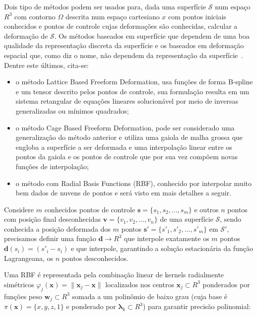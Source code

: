 Dois tipo de métodos podem ser usados para, dada uma superfície $\mathcal{S}$ num espaço $R^3$ com contorno $\Omega$ descrita num espaço cartesiano $x$ com pontos iniciais conhecidos e pontos de controle cujas deformações são conhecidas, calcular a deformação de $\mathcal{S}$. Os métodos baseados em superfície que dependem de uma boa qualidade da representação discreta da superfície e os baseados em deformação espacial que, como diz o nome, não dependem da representação da superfície~\cite{Botsch}. Dentre este últimos, cita-se: 

\renewcommand{\labelitemi}{•}
\begin{itemize}
  \item o método Lattice Based Freeform Deformation, usa funções de forma B-spline e um tensor descrito pelos pontos de controle, sua formulação resulta em um sistema retangular de equações lineares solucionável por meio de inversas generalizadas ou mínimos quadrados;
  \item o método Cage Based Freeform Deformation, pode ser considerado uma generalização do método anterior e utiliza uma gaiola de malha grossa que engloba a superfície a ser deformada e uma interpolação linear entre os pontos da gaiola e os pontos de controle que por sua vez compõem novas funções de interpolação;
  \item o método com Radial Basis Functions (RBF), conhecido por interpolar muito bem dados de nuvens de pontos e será visto em mais detalhes a seguir.
\end{itemize}

Considere $m$ conhecidos pontos de controle $\boldsymbol{s}=\{s_1, s_2, \ldots, s_m\}$ e outros $n$ pontos com posição final desconhecidas $\boldsymbol{v}=\{v_1, v_2, \ldots, v_n\}$ de uma superfície $\mathcal{S}$, sendo conhecida a posição deformada dos $m$ pontos $\boldsymbol{s'}=\{s'_1, s'_2, \ldots, s'_m\}$ em $\mathcal{S}'$, precisamos definir uma função $\boldsymbol{d}\to R^3$ que interpole exatamente os $m$ pontos $\boldsymbol{d}(s_i)=(s'_i-s_i)$ e que interpole, garantindo a solução estacionária da função Lagrangeana, os $n$ pontos desconhecidos.

Uma RBF é representada pela combinação linear de kernels radialmente simétricos $\varphi_j(\boldsymbol{x})=\lVert\boldsymbol{x}_j-\boldsymbol{x}\rVert$ localizados nos centros $\boldsymbol{x}_j\subset R^3$ ponderados por funções peso $\boldsymbol{w}_j\subset R^3$ somada a um polinômio de baixo grau (cuja base é $\pi(\boldsymbol{x})=\{x,y,z,1\}$ e ponderado por $\boldsymbol{\lambda}_k\subset R^3$) para garantir precisão polinomial:

